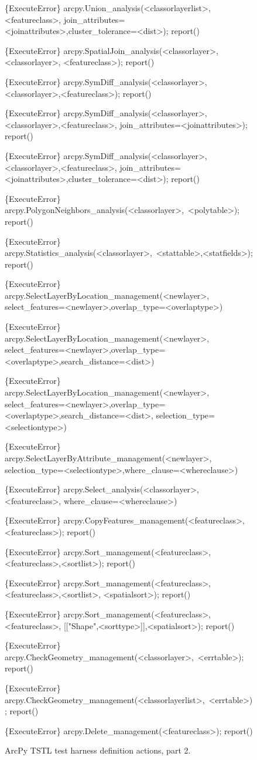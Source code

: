 \begin{figure}
{\begin{code}
\{ExecuteError\} arcpy.Union\_analysis(<classorlayerlist>,<featureclass>,
   join\_attributes=<joinattributes>,cluster\_tolerance=<dist>); report()

\{ExecuteError\} arcpy.SpatialJoin\_analysis(<classorlayer>,<classorlayer>,
   <featureclass>); report()

\{ExecuteError\} arcpy.SymDiff\_analysis(<classorlayer>,<classorlayer>,<featureclass>);
   report()

\{ExecuteError\} arcpy.SymDiff\_analysis(<classorlayer>,<classorlayer>,<featureclass>,
   join\_attributes=<joinattributes>); report()

\{ExecuteError\} arcpy.SymDiff\_analysis(<classorlayer>,<classorlayer>,<featureclass>,
   join\_attributes=<joinattributes>,cluster\_tolerance=<dist>); report()

\{ExecuteError\} arcpy.PolygonNeighbors\_analysis(<classorlayer>,~<polytable>); report()

\{ExecuteError\} arcpy.Statistics\_analysis(<classorlayer>,~<stattable>,<statfields>);
   report()

\{ExecuteError\} arcpy.SelectLayerByLocation\_management(<newlayer>,
   select\_features=<newlayer>,overlap\_type=<overlaptype>)

\{ExecuteError\} arcpy.SelectLayerByLocation\_management(<newlayer>,
   select\_features=<newlayer>,overlap\_type=<overlaptype>,search\_distance=<dist>)

\{ExecuteError\} arcpy.SelectLayerByLocation\_management(<newlayer>,
   select\_features=<newlayer>,overlap\_type=<overlaptype>,search\_distance=<dist>,
   selection\_type=<selectiontype>)

\{ExecuteError\} arcpy.SelectLayerByAttribute\_management(<newlayer>,
   selection\_type=<selectiontype>,where\_clause=<whereclause>)

\{ExecuteError\} arcpy.Select\_analysis(<classorlayer>,<featureclass>,
   where\_clause=<whereclause>)

\{ExecuteError\} arcpy.CopyFeatures\_management(<featureclass>,<featureclass>); report()

\{ExecuteError\} arcpy.Sort\_management(<featureclass>,<featureclass>,<sortlist>);
   report()

\{ExecuteError\} arcpy.Sort\_management(<featureclass>,<featureclass>,<sortlist>,
   <spatialsort>); report()

\{ExecuteError\} arcpy.Sort\_management(<featureclass>,<featureclass>,
   [["Shape",<sorttype>]],<spatialsort>); report()

\{ExecuteError\} arcpy.CheckGeometry\_management(<classorlayer>,~<errtable>); report()

\{ExecuteError\} arcpy.CheckGeometry\_management(<classorlayerlist>,~<errtable>); report()

\{ExecuteError\} arcpy.Delete\_management(<featureclass>); report()
\end{code}
}
\caption{ArcPy TSTL test harness definition actions, part 2.}
\label{actions2}
\end{figure}

